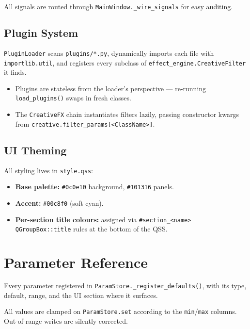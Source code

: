 \documentclass[11pt,a4paper,openany]{report}
\begin{document}
All signals are routed through \texttt{MainWindow.\_wire\_signals} for easy
auditing.

\section{Plugin System}

\texttt{PluginLoader} scans \texttt{plugins/*.py}, dynamically imports each
file with \texttt{importlib.util}, and registers every subclass of
\texttt{effect\_engine.CreativeFilter} it finds.

\begin{itemize}
    \item Plugins are stateless from the loader's perspective ---
        re-running \texttt{load\_plugins()} swaps in fresh classes.
    \item The \texttt{CreativeFX} chain instantiates filters lazily,
        passing constructor kwargs from
        \texttt{creative.filter\_params[<ClassName>]}.
\end{itemize}

\section{UI Theming}

All styling lives in \texttt{style.qss}:

\begin{itemize}
    \item \textbf{Base palette:} \texttt{\#0c0e10} background,
        \texttt{\#101316} panels.
    \item \textbf{Accent:} \texttt{\#00c8f0} (soft cyan).
    \item \textbf{Per-section title colours:} assigned via
        \texttt{\#section\_<name> QGroupBox::title} rules at the bottom of
        the QSS.
\end{itemize}

\chapter{Parameter Reference}

Every parameter registered in \texttt{ParamStore.\_register\_defaults()},
with its type, default, range, and the UI section where it surfaces.

\begin{btnote}
All values are clamped on \texttt{ParamStore.set} according to the
\texttt{min}/\texttt{max} columns. Out-of-range writes are silently
corrected.
\end{btnote}
\end{document}
